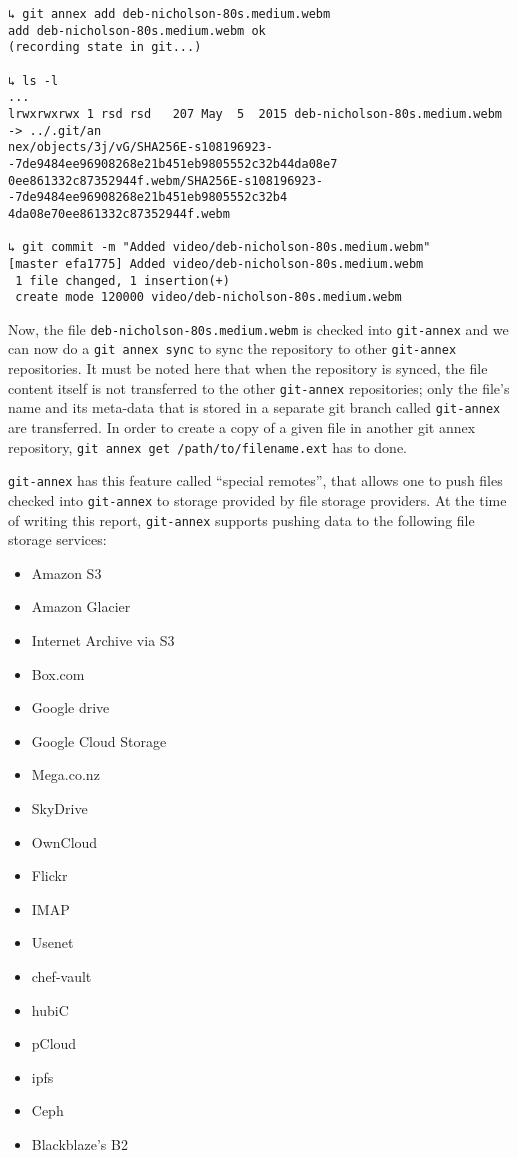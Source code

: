 {\small
\begin{verbatim}
↳ git annex add deb-nicholson-80s.medium.webm
add deb-nicholson-80s.medium.webm ok
(recording state in git...)

↳ ls -l
...
lrwxrwxrwx 1 rsd rsd   207 May  5  2015 deb-nicholson-80s.medium.webm -> ../.git/an
nex/objects/3j/vG/SHA256E-s108196923--7de9484ee96908268e21b451eb9805552c32b44da08e7
0ee861332c87352944f.webm/SHA256E-s108196923--7de9484ee96908268e21b451eb9805552c32b4
4da08e70ee861332c87352944f.webm

↳ git commit -m "Added video/deb-nicholson-80s.medium.webm"
[master efa1775] Added video/deb-nicholson-80s.medium.webm
 1 file changed, 1 insertion(+)
 create mode 120000 video/deb-nicholson-80s.medium.webm
\end{verbatim}
}

Now, the file \verb+deb-nicholson-80s.medium.webm+ is checked into
\verb+git-annex+ and we can now do a \verb+git annex sync+ to sync the
repository to other \verb+git-annex+ repositories. It must be noted
here that when the repository is synced, the file content itself is
not transferred to the other \verb+git-annex+ repositories; only the
file's name and its meta-data that is stored in a separate git branch
called \verb+git-annex+ are
transferred\cite{documentation:git-annex-hworks}. In order to create a
copy of a given file in another git annex repository,
\verb+git annex get /path/to/filename.ext+ has to done.

\verb+git-annex+ has this feature called ``special
remotes''\cite{documentation:git-annex-sremotes}, that allows one to
push files checked into \verb+git-annex+ to storage provided by file
storage providers. At the time of writing this report,
\verb+git-annex+ supports pushing data to the following file storage
services:

{\scriptsize
\begin{itemize}
\item Amazon S3
\item Amazon Glacier
\item Internet Archive via S3
\item Box.com
\item Google drive
\item Google Cloud Storage
\item Mega.co.nz
\item SkyDrive
\item OwnCloud
\item Flickr
\item IMAP
\item Usenet
\item chef-vault
\item hubiC
\item pCloud
\item ipfs
\item Ceph
\item Blackblaze's B2
\end{itemize}
}

